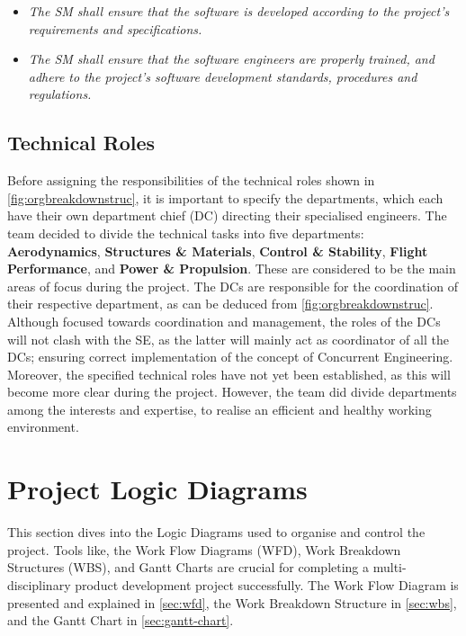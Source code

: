 \begin{itemize}
\begin{itemize}
        \item \textit{The SM shall ensure that the software is developed according to the project's requirements and specifications.}
        \item \textit{The SM shall ensure that the software engineers are properly trained, and adhere to the project's software development standards, procedures and regulations.}
    \end{itemize}
\end{itemize}


\subsection{Technical Roles}\label{sec:technical-roles}
Before assigning the responsibilities of the technical roles shown in \cref{fig:orgbreakdownstruc}, it is important to specify the departments, which each have their own department chief (DC) directing their specialised engineers.
The team decided to divide the technical tasks into five departments: \textbf{Aerodynamics}, \textbf{Structures \& Materials}, \textbf{Control \& Stability}, \textbf{Flight Performance}, and \textbf{Power \& Propulsion}.
These are considered to be the main areas of focus during the project. 
The DCs are responsible for the coordination of their respective department, as can be deduced from \cref{fig:orgbreakdownstruc}.
Although focused towards coordination and management, the roles of the DCs will not clash with the SE, as the latter will mainly act as coordinator of all the DCs; ensuring correct implementation of the concept of Concurrent Engineering.
Moreover, the specified technical roles have not yet been established, as this will become more clear during the project.
However, the team did divide departments among the interests and expertise, to realise an efficient and healthy working environment.


\section{Project Logic Diagrams}\label{sec:projlogicdiag}
This section dives into the Logic Diagrams used to organise and control the project.
Tools like, the Work Flow Diagrams (WFD), Work Breakdown Structures (WBS), and Gantt Charts are crucial for completing a multi-disciplinary product development project successfully.
The Work Flow Diagram is presented and explained in \cref{sec:wfd}, the Work Breakdown Structure in \cref{sec:wbs}, and the Gantt Chart in \cref{sec:gantt-chart}.

